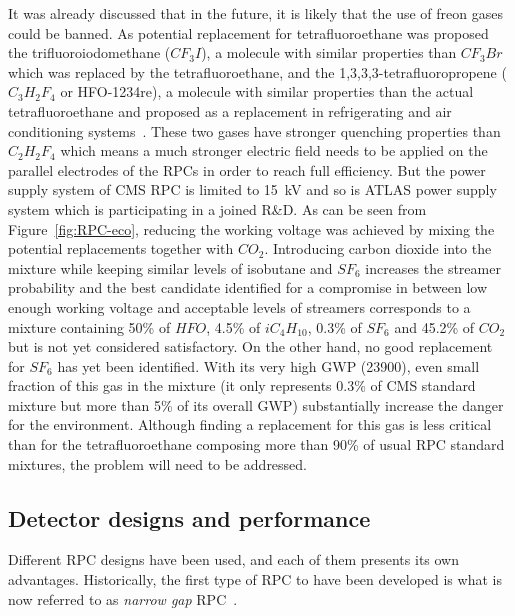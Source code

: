 	It was already discussed that in the future, it is likely that the use of freon gases could be banned. As potential replacement for tetrafluoroethane was proposed the trifluoroiodomethane ($CF_3I$), a molecule with similar properties than $CF_3Br$ which was replaced by the tetrafluoroethane, and the 1,3,3,3-tetrafluoropropene ($C_3H_2F_4$ or HFO-1234re), a molecule with similar properties than the actual tetrafluoroethane and proposed as a replacement in refrigerating and air conditioning systems~\cite{HFO2015}. These two gases have stronger quenching properties than $C_2H_2F_4$ which means a much stronger electric field needs to be applied on the parallel electrodes of the RPCs in order to reach full efficiency. But the power supply system of CMS RPC is limited to \SI{15}{kV} and so is ATLAS power supply system which is participating in a joined R\&D. As can be seen from Figure~\ref{fig:RPC-eco}, reducing the working voltage was achieved by mixing the potential replacements together with $CO_2$. Introducing carbon dioxide into the mixture while keeping similar levels of isobutane and $SF_6$ increases the streamer probability and the best candidate identified for a compromise in between low enough working voltage and acceptable levels of streamers corresponds to a mixture containing 50\% of $HFO$, 4.5\% of $iC_4H_{10}$, 0.3\% of $SF_6$ and 45.2\% of $CO_2$ but is not yet considered satisfactory. On the other hand, no good replacement for $SF_6$ has yet been identified. With its very high \acl{GWP} (23900), even small fraction of this gas in the mixture (it only represents 0.3\% of CMS standard mixture but more than 5\% of its overall GWP) substantially increase the danger for the environment. Although finding a replacement for this gas is less critical than for the tetrafluoroethane composing more than 90\% of usual RPC standard mixtures, the problem will need to be addressed.
	
	\subsection{Detector designs and performance}
	\label{chapt4:ssec:design}
	
	Different RPC designs have been used, and each of them presents its own advantages. Historically, the first type of RPC to have been developed is what is now referred to as \textit{narrow gap} RPC~\cite{SANTONICO81,ZEBALLOS96COMP}.
	
